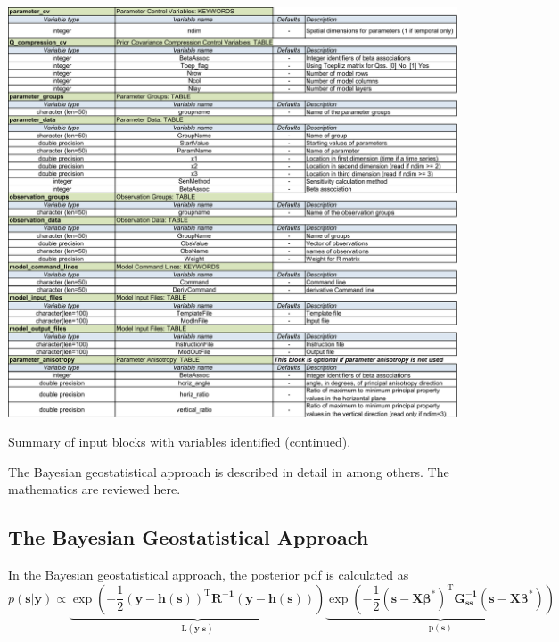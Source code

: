 \documentclass[11pt,oneside,onecolumn]{usgsreport}
\begin{document}
\begin{appendix}
\begin{table}[H]
\begin{center}\includegraphics[scale=0.5]{Variables_for_documentation2}\end{center}

\caption{Summary of input blocks with variables identified (continued).}
\end{table}




The Bayesian geostatistical approach is described in detail in \citet{KitanidisVomvoris1983,HoeksemaKitanidis1984a,Kitanidis1995,NowakCirpka2004}
among others. The mathematics are reviewed here.


\subsection{The Bayesian Geostatistical Approach}

In the Bayesian geostatistical approach, the posterior pdf is calculated
as 
\begin{equation}
p(\mathbf{s|y})\propto\mathrm{\underbrace{\exp\left(\mathbf{-}\frac{1}{2}\left(\mathbf{y-h}(\mathbf{s})\right)^{T}\mathbf{R^{-1}\left(\mathbf{y-h}(\mathbf{s})\right)}\right)}_{L\left(\mathbf{y}|\mathbf{s}\right)}\underbrace{\exp\left(\mathbf{-}\frac{1}{2}(\mathbf{s-X\beta}^{*})^{T}\mathbf{G_{\mathbf{ss}}^{-1}}(\mathbf{s-X\beta^{*}})\right)}_{p\left(\mathbf{s}\right)}}\label{eq:BGA}
\end{equation}


\end{appendix}
\end{document}
